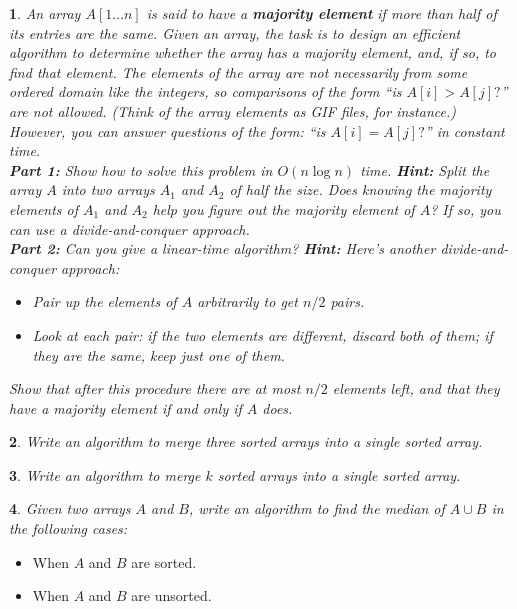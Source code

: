 \documentclass[%
addpoints]{exam}
\theoremstyle{problem}
\newtheorem{p}{}
\begin{document}
\begin{p}
An array \( A[1 \dots n] \) is said to have a \textbf{majority element} if more than half of its entries are the same. Given an array, the task is to design an efficient algorithm to determine whether the array has a majority element, and, if so, to find that element. The elements of the array are not necessarily from some ordered domain like the integers, so comparisons of the form “is \( A[i] > A[j]? \)” are not allowed. (Think of the array elements as GIF files, for instance.) However, you can answer questions of the form: “is \( A[i] = A[j]? \)” in constant time.\\
\vspace{10pt}
\textbf{Part 1:} Show how to solve this problem in \( O(n \log n) \) time. 
\textbf{Hint:} Split the array \( A \) into two arrays \( A_1 \) and \( A_2 \) of half the size. Does knowing the majority elements of \( A_1 \) and \( A_2 \) help you figure out the majority element of \( A \)? If so, you can use a \textit{divide-and-conquer} approach.\\
\vspace{10pt}
\textbf{Part 2:} Can you give a linear-time algorithm? 
\textbf{Hint:} Here’s another \textit{divide-and-conquer} approach:
\begin{itemize}
    \item Pair up the elements of \( A \) arbitrarily to get \( n/2 \) pairs.
    \item Look at each pair: if the two elements are different, discard both of them; if they are the same, keep just one of them.
\end{itemize}
Show that after this procedure there are at most \( n/2 \) elements left, and that they have a majority element if and only if \( A \) does.
\hfill \end{p}

\newpage

\begin{p}
Write an algorithm to merge three sorted arrays into a single sorted array.\\
\hfill \end{p}

\begin{p}
Write an algorithm to merge \( k \) sorted arrays into a single sorted array.\\
\hfill \end{p}

\begin{p}
Given two arrays \( A \) and \( B \), write an algorithm to find the median of \( A \cup B \) in the following cases:  
\hfill \end{p}
\begin{itemize}
    \item When \( A \) and \( B \) are sorted.
    \item When \( A \) and \( B \) are unsorted.
\end{itemize}
\end{document}
